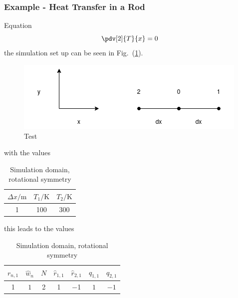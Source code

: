 \subsubsection{Example - Heat Transfer in a Rod}
Equation
\begin{equation}
	\pdv[2]{T}{x} = 0
\end{equation}
the simulation set up can be seen in Fig.~(\ref{fig:rod_heat_transfer}).
\begin{figure}[ht]
    \label{fig:rod_heat_transfer}
    \centering
    \includegraphics[width=0.8\linewidth]{rod.png}
    \caption{Test}
\end{figure}
with the values
\begin{table}[ht]
	\centering
    \caption{Simulation domain, rotational symmetry}
    \begin{tabular}{ccc}
    	\hline
    	$\Delta x / \si{\meter}$ & $T_1 / \si{\kelvin}$ & $T_2 / \si{\kelvin}$ \\
    	\hline\hline
    	\num{1} & \num{100} &\num{300} \\
    	\hline
    \end{tabular}
\end{table}
this leads to the values
\begin{table}[ht]
	\centering
    \caption{Simulation domain, rotational symmetry}
    \begin{tabular}{ccccccc}
    	\hline
    	$r_{n, 1}$ & $\hat{w}_n$ & $N$ & $\hat{r}_{1, 1}$ & $\hat{r}_{2, 1}$ & $q_{1, 1}$ & $q_{2, 1}$\\
    	\hline\hline
    	\num{1} & $1$ & \num{2} & \num{1} & \num{-1} & $1$ & $-1$ \\
    	\hline
    \end{tabular}
\end{table}
